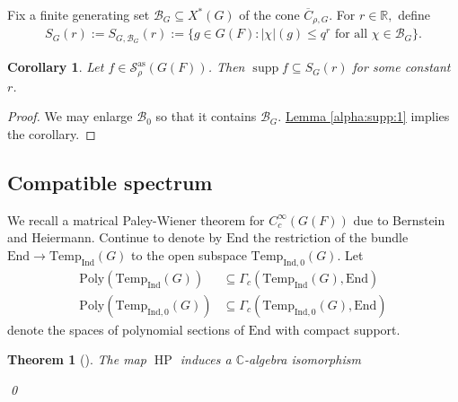 \documentclass[10pt]{amsart}
\newtheorem{theorem}{Theorem}[section]
\newtheorem{corollary}{Corollary}[theorem]
\theoremstyle{definition}
\numberwithin{equation}{section}
\DeclareMathOperator{\supp}{\mathrm{supp}}
\numberwithin{equation}{subsection}
\newcommand{\Ind}{\mathrm{Ind}}
\newcommand{\RR}{\mathbb{R}}
\newcommand{\calB}{\mathcal{B}}
\newcommand{\Temp}{\mathrm{Temp}}
\newcommand{\HP}{\mathop{\mathrm{HP}}\nolimits}
\begin{document}
Fix a finite generating set $\calB_G\subseteq X^*(G)$ of the cone $\overline{C}_{\rho,G}$. For $r\in \RR,$ define
\begin{align*}
    S_{G}(r):=S_{G,\calB_G}(r):=\{g\in G(F): |\chi|(g)\le q^{r} \text{ for all }\chi\in\calB_G\}.
\end{align*}

\begin{corollary}\label{Sas:f1alpha:polynomial}  Let $f\in \mathcal{S}_\rho^{\mathrm{as}}(G(F))$. Then $\supp f\subseteq S_G(r)$ for some constant $r$.
\end{corollary}
\begin{proof} We may enlarge $\mathcal{B}_0$ so that it contains $\mathcal{B}_G.$ \hyperref[alpha:supp:1]{Lemma \ref{alpha:supp:1}} implies the corollary.
\end{proof}





\subsection{Compatible spectrum} 

We recall a matrical Paley-Wiener theorem for $C_c^\infty(G(F))$ due to Bernstein and Heiermann. Continue to denote by $\mathrm{End}$ the restriction of the bundle $\mathrm{End}\to \Temp_\Ind(G)$ to the open subspace $\Temp_{\Ind,0}(G)$. Let
\begin{align*}
     \mathrm{Poly}(\Temp_{\Ind}(G)) &\subseteq \Gamma_c(\Temp_{\Ind}(G),\mathrm{End})\\
    \mathrm{Poly}(\Temp_{\Ind,0}(G)) &\subseteq \Gamma_c(\Temp_{\Ind,0}(G),\mathrm{End})
\end{align*}
denote the spaces of polynomial sections of $\mathrm{End}$ with compact support.

\begin{theorem}[\cite{Heiermann:HeckePlan}]\label{BH:PW} The map $\HP$ induces a $\mathbb{C}$-algebra isomorphism
\begin{center}
\end{center}
\qed
\end{theorem}
\end{document}
